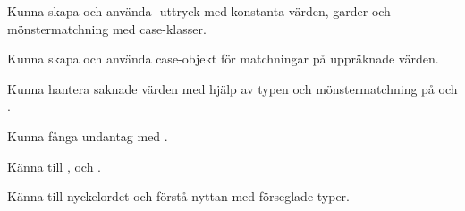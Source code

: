 

\ifPreSolution



\Exercise{\ExeWeekSIX}\label{exe:W06}

\begin{Goals}
\item Kunna skapa och använda -uttryck med konstanta värden, garder och mönstermatchning med case-klasser.
\item Kunna skapa och använda case-objekt för matchningar på uppräknade värden.
\item Kunna hantera saknade värden med hjälp av typen  och mönstermatchning på  och .
\item Kunna fånga undantag med .
\item Känna till ,  och .
\item Känna till nyckelordet  och förstå nyttan med förseglade typer.
\end{Goals}

\begin{Preparations}
\item {}
\end{Preparations}

\BasicTasks %

\else



